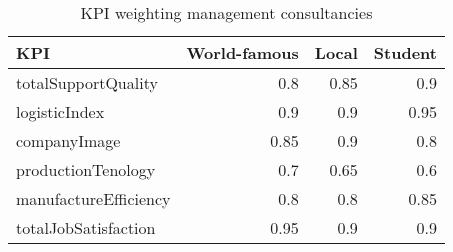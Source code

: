 \begin{table}[h]
\centering
\begin{tabular}{|l|r|r|r|}
\hline
\textbf{KPI}            & \textbf{World-famous}   & \textbf{Local}  & \textbf{Student} \\ \hline
totalSupportQuality     & 0.8               & 0.85       & 0.9       \\
logisticIndex           & 0.9               & 0.9        & 0.95      \\
companyImage            & 0.85              & 0.9        & 0.8       \\
productionTenology      & 0.7               & 0.65       & 0.6       \\
manufactureEfficiency   & 0.8               & 0.8        & 0.85      \\
totalJobSatisfaction    & 0.95              & 0.9        & 0.9       \\
\hline
\end{tabular}
\caption{KPI weighting management consultancies}
\label{mngc_weighting}
\end{table}

